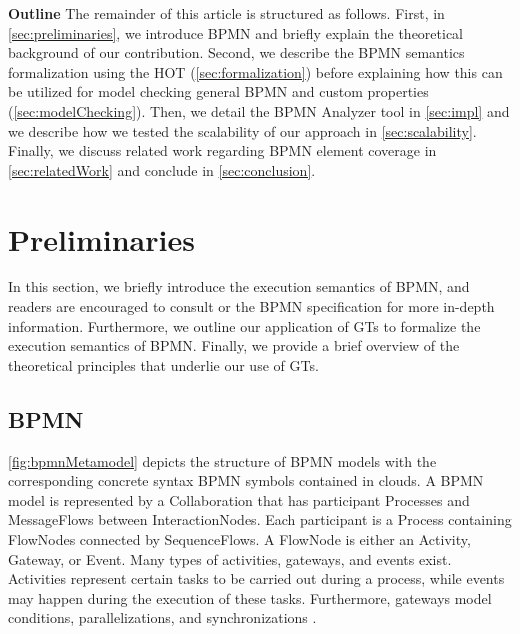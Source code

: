 \documentclass{lmcs} %
\begin{document}
\textbf{Outline} The remainder of this article is structured as follows.
First, in \autoref{sec:preliminaries}, we introduce BPMN and briefly explain the theoretical background of our contribution.
Second, we describe the BPMN semantics formalization using the HOT (\autoref{sec:formalization}) before explaining how this can be utilized for model checking general BPMN and custom properties (\autoref{sec:modelChecking}).
Then, we detail the BPMN Analyzer tool in \autoref{sec:impl} and we describe how we tested the scalability of our approach in \autoref{sec:scalability}.
Finally, we discuss related work regarding BPMN element coverage in \autoref{sec:relatedWork} and conclude in \autoref{sec:conclusion}.

\section{Preliminaries} \label{sec:preliminaries}

In this section, we briefly introduce the execution semantics of BPMN, and readers are encouraged to consult \cite{freundRealLifeBPMNUsing2019} or the BPMN specification \cite{objectmanagementgroupBusinessProcessModel2013} for more in-depth information. 
Furthermore, we outline our application of GTs to formalize the execution semantics of BPMN.
Finally, we provide a brief overview of the theoretical principles that underlie our use of GTs.


\subsection{BPMN}
\autoref{fig:bpmnMetamodel} depicts the structure of BPMN models with the corresponding concrete syntax BPMN symbols contained in clouds.
A BPMN model is represented by a \textsf{Collaboration} that has participant \textsf{Process}es and \textsf{MessageFlow}s between \textsf{InteractionNode}s.
Each participant is a \textsf{Process} containing \textsf{FlowNode}s connected by \textsf{SequenceFlow}s.
A \textsf{FlowNode} is either an \textsf{Activity}, \textsf{Gateway}, or \textsf{Event}.
Many types of activities, gateways, and events exist. %
Activities represent certain tasks to be carried out during a process, while events may happen during the execution of these tasks.
Furthermore, gateways model conditions, parallelizations, and synchronizations \cite{freundRealLifeBPMNUsing2019}.
\end{document}
